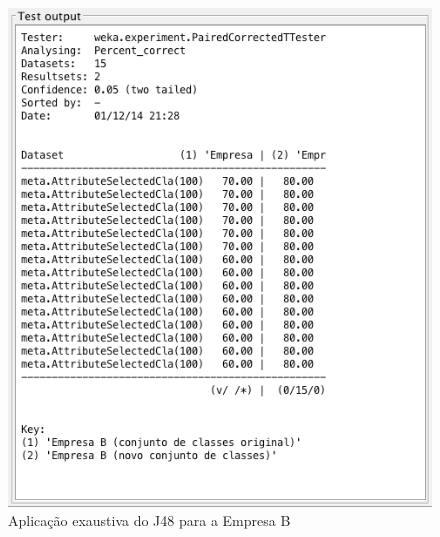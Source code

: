 \begin{figure}[p]
	\centering
	\includegraphics[width=\textwidth]{figs/empresa_b/exaustive-j48.png}
	\caption{\label{fig_13}Aplicação exaustiva do J48 para a Empresa B}
\end{figure}
\clearpage

